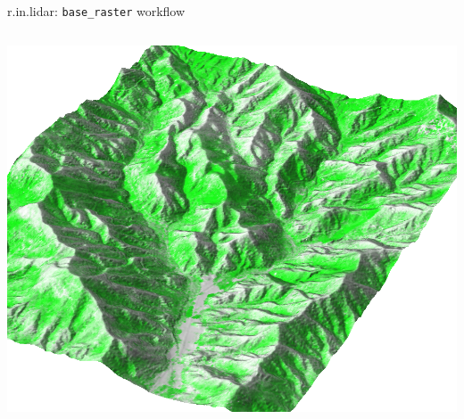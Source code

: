 \documentclass[xcolor={dvipsnames,usenames},beamer,aspectratio=169]{beamer}
\begin{document}
\begin{frame}{r.in.lidar: \texttt{base\_raster} workflow}
\begin{columns}
\begin{column}{0.45\textwidth}
\begin{center}
  \includegraphics[width=\textwidth]{grass/max_height_10m_on_ground_from_neighbors_smaller_area_top}
\end{center}

\end{column}
\end{columns}

\end{frame}
\end{document}
